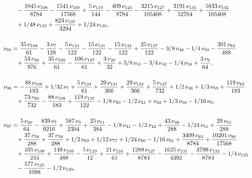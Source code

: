 \documentclass[a4paper,12pt, DIV=14, BCOR=5mm, twoside, headsepline]{scrbook}
\begin{document}
\begin{align}
\begin{aligned}
 &\hphantom{=}-{\frac {1045\,\nu_
{{108}}}{8784}}-{\frac {1541\,\nu_{{109}}}{17568}}+{\frac {5\,\nu_{{
119}}}{144}}-{\frac {409\,\nu_{{124}}}{8784}}-{\frac {3215\,\nu_{{127}
}}{105408}}+{\frac {3191\,\nu_{{131}}}{52704}}+{\frac {5833\,\nu_{{132
}}}{105408}}\\
 &\hphantom{=}+1/48\,\nu_{{135}}+{\frac {823\,\nu_{{137}}}{3294}}+1/24\,
\nu_{{139}}, \\
\\
\nu_{{95}}&={\frac {35\,\nu_{{108}}}{61}}-{\frac {3\,\nu_{{
7}}}{128}}-{\frac {5\,\nu_{{124}}}{122}}-{\frac {15\,\nu_{{131}}}{122}
}-{\frac {15\,\nu_{{132}}}{122}}+{\frac {25\,\nu_{{127}}}{122}}-3/8\,
\nu_{{48}}-1/4\,\nu_{{59}}-{\frac {301\,\nu_{{83}}}{488}}\\
 &\hphantom{=}+{\frac {53\,
\nu_{{90}}}{976}}+{\frac {35\,\nu_{{109}}}{61}}-{\frac {106\,\nu_{{137
}}}{61}}+{\frac {3\,\nu_{{20}}}{32}}+3/8\,\nu_{{41}}-3/4\,\nu_{{42}}-1
/4\,\nu_{{58}}+{\frac {3\,\nu_{{9}}}{64}},  \\
\\
\nu_{{96}}&=-{\frac {88\,\nu_
{{108}}}{183}}+1/32\,\nu_{{7}}+{\frac {5\,\nu_{{124}}}{61}}+{\frac {29
\,\nu_{{131}}}{366}}+{\frac {29\,\nu_{{132}}}{366}}+{\frac {5\,\nu_{{
127}}}{732}}+1/2\,\nu_{{48}}+1/3\,\nu_{{59}}+{\frac {119\,\nu_{{83}}}{
183}}\\
 &\hphantom{=}+{\frac {73\,\nu_{{90}}}{732}}-{\frac {88\,\nu_{{109}}}{183}}+{
\frac {119\,\nu_{{137}}}{122}}-1/8\,\nu_{{20}}-1/2\,\nu_{{41}}+\nu_{{
42}}+1/3\,\nu_{{58}}-1/16\,\nu_{{9}}, \\
\\
\nu_{{97}}&={\frac {5\,\nu_{{20}}
}{64}}-{\frac {839\,\nu_{{7}}}{9216}}+{\frac {587\,\nu_{{9}}}{2304}}+{
\frac {25\,\nu_{{11}}}{384}}-1/8\,\nu_{{41}}-1/2\,\nu_{{42}}+{\frac {
43\,\nu_{{48}}}{288}}-1/24\,\nu_{{51}}+{\frac {29\,\nu_{{55}}}{288}}\\
 &\hphantom{=}+{
\frac {37\,\nu_{{58}}}{288}}+{\frac {37\,\nu_{{59}}}{288}}+1/2\,\nu_{{
69}}+1/12\,\nu_{{77}}+1/24\,\nu_{{80}}-1/16\,\nu_{{81}}+{\frac {3409\,
\nu_{{83}}}{8784}}+{\frac {10201\,\nu_{{90}}}{17568}}\\
 &\hphantom{=}+{\frac {105\,\nu
_{{108}}}{244}}+{\frac {149\,\nu_{{109}}}{488}}-{\frac {5\,\nu_{{119}}
}{12}}+{\frac {21\,\nu_{{124}}}{61}}+{\frac {1289\,\nu_{{127}}}{8784}}
-{\frac {1625\,\nu_{{131}}}{4392}}-{\frac {3799\,\nu_{{132}}}{8784}}-1
/4\,\nu_{{135}}\\
 &\hphantom{=}-{\frac {577\,\nu_{{137}}}{1098}}-1/2\,\nu_{{139}}, 
\end{aligned}
\end{align}
\end{document}
